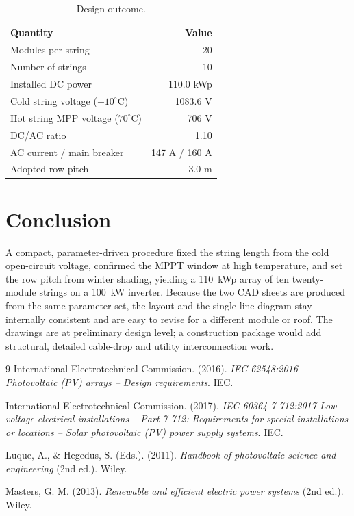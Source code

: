 \documentclass[11pt,a4paper]{article}
\begin{document}
\begin{table}[h]
\centering
\caption{Design outcome.}
\label{tab:results}
\begin{tabular}{lr}
\toprule
Quantity & Value \\
\midrule
Modules per string              & 20 \\
Number of strings               & 10 \\
Installed DC power              & 110.0 kWp \\
Cold string voltage ($-10^\circ$C) & 1083.6 V \\
Hot string MPP voltage ($70^\circ$C) & 706 V \\
DC/AC ratio                     & 1.10 \\
AC current / main breaker       & 147 A / 160 A \\
Adopted row pitch               & 3.0 m \\
\bottomrule
\end{tabular}
\end{table}

\section{Conclusion}
A compact, parameter-driven procedure fixed the string length from the cold open-circuit voltage,
confirmed the MPPT window at high temperature, and set the row pitch from winter shading, yielding a
110~kWp array of ten twenty-module strings on a 100~kW inverter. Because the two CAD sheets are
produced from the same parameter set, the layout and the single-line diagram stay internally
consistent and are easy to revise for a different module or roof. The drawings are at preliminary
design level; a construction package would add structural, detailed cable-drop and utility
interconnection work.

\begin{thebibliography}{9}
International Electrotechnical Commission. (2016). \textit{IEC 62548:2016 Photovoltaic (PV) arrays --
Design requirements}. IEC.

International Electrotechnical Commission. (2017). \textit{IEC 60364-7-712:2017 Low-voltage electrical
installations -- Part 7-712: Requirements for special installations or locations -- Solar photovoltaic
(PV) power supply systems}. IEC.

Luque, A., \& Hegedus, S. (Eds.). (2011). \textit{Handbook of photovoltaic science and engineering}
(2nd ed.). Wiley.

Masters, G. M. (2013). \textit{Renewable and efficient electric power systems} (2nd ed.). Wiley.
\end{thebibliography}
\end{document}
